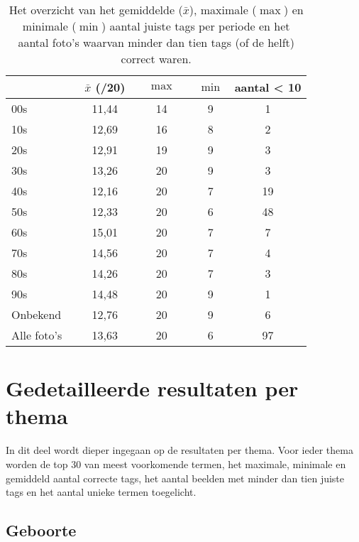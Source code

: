 \begin{table}
    \renewcommand\arraystretch{1.2}
    \centering
	\begin{tabular}{ll|cccccc}
		\toprule
		& &$\bar{x}$ (/20)&&  $\max$ && $\min$ &  aantal < 10 \\ 
		\midrule
		00s && 11,44 && 14 && 9 & 1 \\ 
		10s & &12,69 && 16 && 8 &  2 \\ 
		20s & &12,91 && 19 && 9 & 3 \\ 
		30s & &13,26 && 20 && 9 & 3 \\ 
		40s & &12,16 && 20 && 7 & 19 \\ 
		50s & &12,33 && 20 && 6 & 48 \\ 
		60s & &15,01 && 20 && 7 & 7 \\ 
		70s & &14,56 && 20 && 7 & 4 \\ 
		80s & &14,26 && 20 && 7 & 3 \\ 
		90s & &14,48 && 20 && 9 & 1 \\ 
		Onbekend && 12,76 && 20 && 9  & 6 \\ 
        \midrule
		Alle foto's && 13,63 && 20 && 6  & 97 \\ 
		\bottomrule
	\end{tabular} 
	\caption[Overzicht van de resultaten per periode na gebruik van het ingebouwde model]{Het overzicht van het gemiddelde ($\bar{x}$), maximale ($\max$) en minimale ($\min$) aantal juiste tags per periode en het aantal foto’s waarvan minder dan tien tags (of de helft) correct waren.}
	\label{tab:analyse-resultaten-periode}
\end{table}

\section{Gedetailleerde resultaten per thema}
\label{sec:gedetailleerde-resultaten-per-thema}

In dit deel wordt dieper ingegaan op de resultaten per thema. Voor ieder thema worden de top 30 van meest voorkomende termen, het maximale, minimale en gemiddeld aantal correcte tags, het aantal beelden met minder dan tien juiste tags en het aantal unieke termen toegelicht. 

\subsection{Geboorte}

